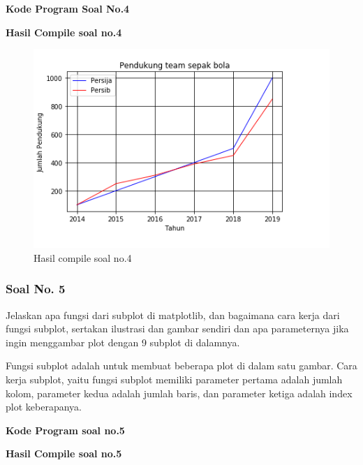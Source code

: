\hfill \break
\textbf{Kode Program Soal No.4}



\hfill \break
\textbf{Hasil Compile soal no.4}

\begin{figure}[H]
	\includegraphics{figures/6/1174021/4.png}
	\centering
	\caption{Hasil compile soal no.4}
\end{figure}

\subsubsection{Soal No. 5}
\hfill \break
Jelaskan apa fungsi dari subplot di matplotlib, dan bagaimana cara kerja dari fungsi subplot, sertakan ilustrasi dan gambar sendiri dan apa parameternya jika ingin menggambar plot dengan 9 subplot di dalamnya.

\hfill \break
Fungsi subplot adalah untuk membuat beberapa plot di dalam satu gambar.
\hfill \break
Cara kerja subplot, yaitu fungsi subplot memiliki parameter pertama adalah jumlah kolom, parameter kedua adalah jumlah baris, dan parameter ketiga adalah index plot keberapanya.

\hfill \break
\textbf{Kode Program soal no.5}



\hfill \break
\textbf{Hasil Compile soal no.5}

